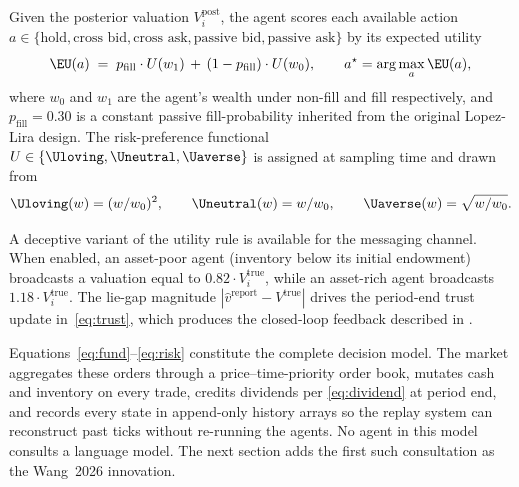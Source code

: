 Given the posterior valuation $V_i^{\text{post}}$, the agent scores
each available action $a\in\{\text{hold},\text{cross bid},\text{cross ask},
\text{passive bid},\text{passive ask}\}$ by its expected utility
\begin{equation}
\EU(a)\;=\;p_{\text{fill}}\cdot U(w_1)\,+\,(1-p_{\text{fill}})\cdot U(w_0),
\qquad a^\star=\arg\max_{a}\EU(a),
\label{eq:eu}
\end{equation}
where $w_0$ and $w_1$ are the agent's wealth under non-fill and
fill respectively, and $p_{\text{fill}}=0.30$ is a constant passive
fill-probability inherited from the original Lopez-Lira design. The
risk-preference functional $U\in\{\Uloving,\Uneutral,\Uaverse\}$ is
assigned at sampling time and drawn from
\begin{equation}
\Uloving(w)=(w/w_0)^{2},\qquad
\Uneutral(w)=w/w_0,\qquad
\Uaverse(w)=\sqrt{w/w_0}.
\label{eq:risk}
\end{equation}

A deceptive variant of the utility rule is available for the
messaging channel. When enabled, an asset-poor agent (inventory
below its initial endowment) broadcasts a valuation equal to
$0.82\cdot V_i^{\text{true}}$, while an asset-rich agent broadcasts
$1.18\cdot V_i^{\text{true}}$. The lie-gap magnitude
$|\hat v^{\text{report}}-V^{\text{true}}|$ drives the period-end
trust update in~\eqref{eq:trust}, which produces the closed-loop
feedback described in \citet{lopezlira2025llm}.

Equations~\eqref{eq:fund}--\eqref{eq:risk} constitute the complete
decision model. The market aggregates these orders through a
price--time-priority order book, mutates cash and inventory on
every trade, credits dividends per \eqref{eq:dividend} at period
end, and records every state in append-only history arrays so the
replay system can reconstruct past ticks without re-running the
agents. No agent in this model consults a language model. The
next section adds the first such consultation as the Wang~2026
innovation.
